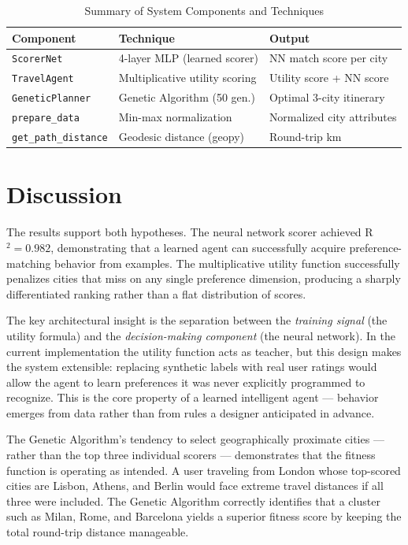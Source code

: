 \documentclass[12pt]{article}
\begin{document}
\begin{table}[h]
\centering
\caption{Summary of System Components and Techniques}
\begin{tabular}{@{}lll@{}}
\toprule
\textbf{Component} & \textbf{Technique} & \textbf{Output} \\ \midrule
\texttt{ScorerNet}      & 4-layer MLP (learned scorer)   & NN match score per city       \\
\texttt{TravelAgent}    & Multiplicative utility scoring & Utility score + NN score      \\
\texttt{GeneticPlanner} & Genetic Algorithm (50 gen.)    & Optimal 3-city itinerary      \\
\texttt{prepare\_data}  & Min-max normalization          & Normalized city attributes    \\
\texttt{get\_path\_distance} & Geodesic distance (geopy) & Round-trip km                 \\ \bottomrule
\end{tabular}
\label{tab:components}
\end{table}

\section{Discussion}
The results support both hypotheses. The neural network scorer achieved R$^2 = 0.982$, demonstrating that a learned agent can successfully acquire preference-matching behavior from examples. The multiplicative utility function successfully penalizes cities that miss on any single preference dimension, producing a sharply differentiated ranking rather than a flat distribution of scores.

The key architectural insight is the separation between the \textit{training signal} (the utility formula) and the \textit{decision-making component} (the neural network). In the current implementation the utility function acts as teacher, but this design makes the system extensible: replacing synthetic labels with real user ratings would allow the agent to learn preferences it was never explicitly programmed to recognize. This is the core property of a learned intelligent agent --- behavior emerges from data rather than from rules a designer anticipated in advance.

The Genetic Algorithm's tendency to select geographically proximate cities — rather than the top three individual scorers — demonstrates that the fitness function is operating as intended. A user traveling from London whose top-scored cities are Lisbon, Athens, and Berlin would face extreme travel distances if all three were included. The Genetic Algorithm correctly identifies that a cluster such as Milan, Rome, and Barcelona yields a superior fitness score by keeping the total round-trip distance manageable.
\end{document}
